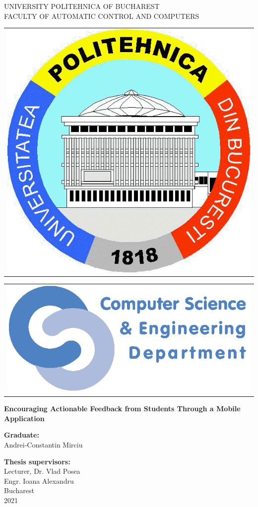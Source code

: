 \thispagestyle{empty}
\begin{center}
\large
UNIVERSITY POLITEHNICA OF BUCHAREST \\
FACULTY OF AUTOMATIC CONTROL AND COMPUTERS \\

\begin{tabular}[t]{@{}l}
	\includegraphics[scale=0.16]{figures/logos/upb.png}
\end{tabular}
\hfill
\begin{tabular}[t]{l@{}}
	\includegraphics[scale=0.3]{figures/logos/cse.png}
\end{tabular}
\vfill\noindent

{\LARGE
	\textbf{Encouraging Actionable Feedback from Students Through a Mobile Application}
}

\vspace{3cm}
\textbf{Graduate:}\\
Andrei-Constantin Mirciu

\bigskip
\bigskip

\textbf{Thesis supervisors:}\\
Lecturer, Dr. Vlad Posea \\
Engr. Ioana Alexandru \\

Bucharest \\
2021 \\
\vspace*{1cm}
\end{center}
